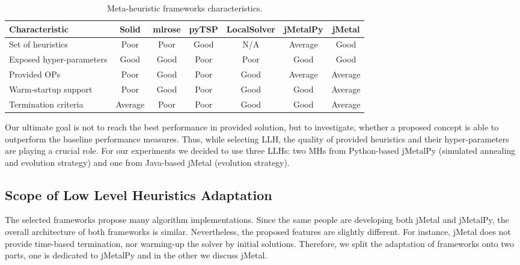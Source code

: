 \begin{table}[h!]
	\centering
	\begin{tabular}{l||cccccc}
		\textbf{Characteristic} & \textbf{Solid} & \textbf{mlrose} & \textbf{pyTSP} & \textbf{LocalSolver} & \textbf{jMetalPy} & \textbf{jMetal} \\
		\hline
		\hline
		Set of heuristics & \cellcolor{red!25}Poor & \cellcolor{red!25}Poor & \cellcolor{green!25}Good & N/A & \cellcolor{yellow!25}Average & \cellcolor{green!25}Good \\
		
		Exposed hyper-parameters & \cellcolor{green!25}Good & \cellcolor{green!25}Good & \cellcolor{red!25}Poor & \cellcolor{red!25}Poor & \cellcolor{green!25}Good & \cellcolor{green!25}Good \\
		
		Provided OPs & \cellcolor{red!25}Poor & \cellcolor{green!25}Good & \cellcolor{red!25}Poor & \cellcolor{green!25}Good & \cellcolor{yellow!25}Average & \cellcolor{yellow!25}Average \\
		
		Warm-startup support & \cellcolor{red!25}Poor & \cellcolor{green!25}Good & \cellcolor{red!25}Poor & \cellcolor{green!25}Good & \cellcolor{green!25}Good & \cellcolor{yellow!25}Average \\
		
		Termination criteria & \cellcolor{yellow!25}Average & \cellcolor{red!25}Poor & \cellcolor{red!25}Poor & \cellcolor{green!25}Good & \cellcolor{green!25}Good & \cellcolor{yellow!25}Average \\
	\end{tabular}
	\caption{Meta-heuristic frameworks characteristics.}
	\label{iml: table llh selection}
\end{table}

Our ultimate goal is not to reach the best performance in provided solution, but to investigate, whether a proposed concept is able to outperform the baseline performance measures. Thus, while selecting LLH, the quality of provided heuristics and their hyper-parameters are playing a crucial role. For our experiments we decided to use three LLHs: two MHs from Python-based jMetalPy (simulated annealing and evolution strategy) and one from Java-based jMetal (evolution strategy).


\subsection{Scope of Low Level Heuristics Adaptation}\label{impl: LLH scope}
The selected frameworks propose many algorithm implementations. Since the same people are developing both jMetal and jMetalPy, the overall architecture of both frameworks is similar. Nevertheless, the proposed features are slightly different. For instance, jMetal does not provide time-based termination, nor warming-up the solver by initial solutions. Therefore, we split the adaptation  of frameworks onto two parts, one is dedicated to jMetalPy and in the other we discuss jMetal.

